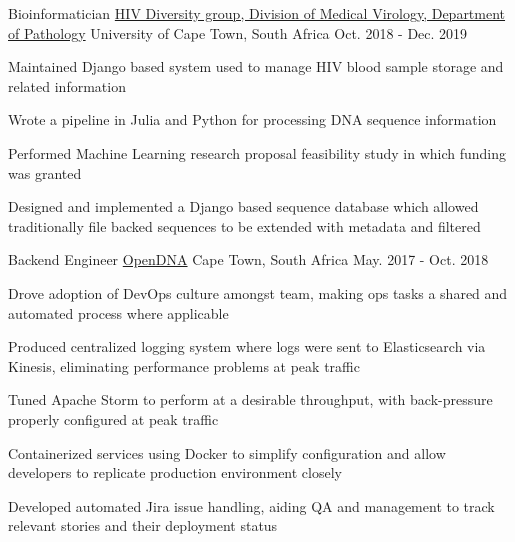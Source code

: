 

\begin{cventries}

  \cventry
    {Bioinformatician} %
    {\href{http://www.virology.uct.ac.za/vir/research/hiv-diversity-group}{HIV Diversity group, Division of Medical Virology, Department of Pathology}} %
    {University of Cape Town, South Africa} %
    {Oct. 2018 - Dec. 2019} %
    {
      \begin{cvitems} %
        \item {Maintained Django based system used to manage HIV blood sample storage and related information}
        \item {Wrote a pipeline in Julia and Python for processing DNA sequence information}
        \item {Performed Machine Learning research proposal feasibility study in which funding was granted}
        \item {Designed and implemented a Django based sequence database which allowed traditionally file backed sequences to be extended with metadata and filtered}
      \end{cvitems}
    }

  \cventry
    {Backend Engineer} %
    {\href{https://opendna.ai}{OpenDNA}} %
    {Cape Town, South Africa} %
    {May. 2017 - Oct. 2018} %
    {
      \begin{cvitems} %
        \item {Drove adoption of DevOps culture amongst team, making ops tasks a shared and automated process where applicable}
        \item {Produced centralized logging system where logs were sent to Elasticsearch via Kinesis, eliminating performance problems at peak traffic}
        \item {Tuned Apache Storm to perform at a desirable throughput, with back-pressure properly configured at peak traffic}
        \item {Containerized services using Docker to simplify configuration and allow developers to replicate production environment closely}
        \item {Developed automated Jira issue handling, aiding QA and management to track relevant stories and their deployment status}
      \end{cvitems}
    }


\end{cventries}
